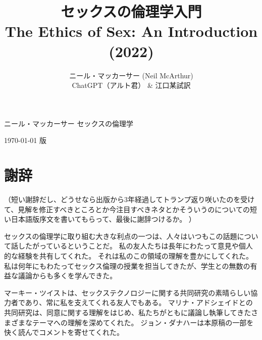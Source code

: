 \documentclass[paper=a4,book,openany]{jlreq} \usepackage{mystyle}
\title{セックスの倫理学入門 \\ The Ethics of Sex: An Introduction (2022)}
\author{ニール・マッカーサー (Neil McArthur) \\ ChatGPT（アルト君） \& 江口某試訳}
\begin{document}
\frontmatter

\begin{center}
\vspace{3\zw}
{\Huge ニール・マッカーサー}
\vspace{1\zw}
{\Huge セックスの倫理学}

   \end{center}

  \begin{center}
  \today\hspace{1\zw} \DTMcurrenttime 版
  \end{center}


\tableofcontents
{}
\chapter*{謝辞}

（短い謝辞だし、どうせなら出版から3年経過してトランプ返り咲いたのを受けて、見解を修正すべきところとか今注目すべきネタとかそういうのについての短い日本語版序文を書いてもらって、最後に謝辞つけるか。
）

\vspace{2\zw}
セックスの倫理学に取り組む大きな利点の一つは、人々はいつもこの話題について話したがっているということだ。
私の友人たちは長年にわたって意見や個人的な経験を共有してくれた。
それは私のこの領域の理解を豊かにしてくれた。
私は何年にもわたってセックス倫理の授業を担当してきたが、学生との無数の有益な議論からも多くを学んできた。

マーキー・ツイストは、セックステクノロジーに関する共同研究の素晴らしい協力者であり、常に私を支えてくれる友人でもある。
マリナ・アドシェイドとの共同研究は、同意に関する理解をはじめ、私たちがともに議論し執筆してきたさまざまなテーマへの理解を深めてくれた。
ジョン・ダナハーは本原稿の一部を快く読んでコメントを寄せてくれた。
\end{document}
